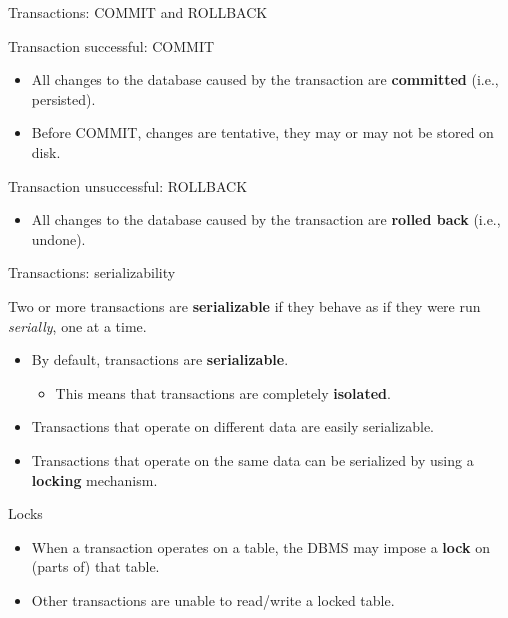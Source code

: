 \documentclass[xcolor=table]{beamer}
\begin{document}
  \begin{frame}{Transactions: COMMIT and ROLLBACK}
    \begin{block}{Transaction successful: COMMIT}
      \begin{itemize}
        \item All changes to the database caused by the transaction
        are {\bf committed} (i.e., persisted).
        \item Before COMMIT, changes are tentative, they may or may not 
        be stored on disk.
      \end{itemize}
    \end{block}

    \vfill
    \begin{exampleblock}{Transaction unsuccessful: ROLLBACK}
      \begin{itemize}
        \item All changes to the database caused by the transaction
        are {\bf rolled back} (i.e., undone).
      \end{itemize}
    \end{exampleblock}
  \end{frame}

  \begin{frame}{Transactions: serializability}
    \begin{definition}
      Two or more transactions are {\bf serializable} if 
      they behave as if they were run {\em serially}, one at a time.
    \end{definition}
    \vfill
    \begin{itemize}
      \item By default, transactions are {\bf serializable}.
      \begin{itemize}
        \item This means that transactions are completely {\bf isolated}.
      \end{itemize}
      \item Transactions that operate on different data are easily serializable.
      \item Transactions that operate on the same data can be serialized 
      by using a {\bf locking} mechanism.
    \end{itemize}
      
    \vfill
    \begin{block}{Locks}
      \begin{itemize}
        \item When a transaction operates on a table, 
        the DBMS may impose a {\bf lock} on (parts of) that table.
        \item Other transactions are unable to read/write a locked table.
      \end{itemize}
    \end{block}

  \end{frame}
\end{document}
